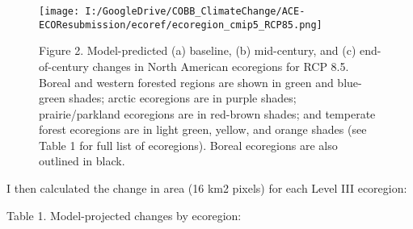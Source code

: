 \documentclass[]{article}
\begin{document}
\begin{figure}
\centering
\texttt{[image: I:/GoogleDrive/COBB\_ClimateChange/ACE-ECOResubmission/ecoref/ecoregion\_cmip5\_RCP85.png]}
\caption{Figure 2. Model-predicted (a) baseline, (b) mid-century, and
(c) end-of-century changes in North American ecoregions for RCP 8.5.
Boreal and western forested regions are shown in green and blue-green
shades; arctic ecoregions are in purple shades; prairie/parkland
ecoregions are in red-brown shades; and temperate forest ecoregions are
in light green, yellow, and orange shades (see Table 1 for full list of
ecoregions). Boreal ecoregions are also outlined in black.}
\end{figure}

I then calculated the change in area (16 km2 pixels) for each Level III
ecoregion:

Table 1. Model-projected changes by ecoregion:
\end{document}
